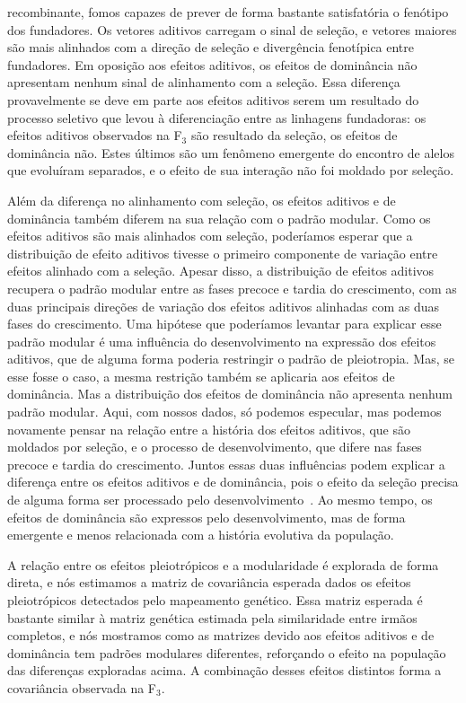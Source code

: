\begin{refsection}
recombinante, fomos capazes de prever de forma bastante satisfatória o
fenótipo dos fundadores. Os vetores aditivos carregam o sinal de seleção, e
vetores maiores são mais alinhados com a direção de seleção e divergência
fenotípica entre fundadores.  Em oposição aos efeitos aditivos, os efeitos de
dominância não apresentam nenhum sinal de alinhamento com a seleção. Essa
diferença provavelmente se deve em parte aos efeitos aditivos serem um
resultado do processo seletivo que levou à diferenciação entre as linhagens
fundadoras: os efeitos aditivos observados na F$_3$ são resultado da seleção,
os efeitos de dominância não. Estes últimos são um fenômeno emergente do
encontro de alelos que evoluíram separados, e o efeito de sua interação não
foi moldado por seleção.

Além da diferença no alinhamento com seleção, os efeitos aditivos e de
dominância também diferem na sua relação com o padrão modular. Como os efeitos
aditivos são mais alinhados com seleção, poderíamos esperar que a distribuição
de efeito aditivos tivesse o primeiro componente de variação entre efeitos
alinhado com a seleção. Apesar disso, a distribuição de efeitos aditivos
recupera o padrão modular entre as fases precoce e tardia do crescimento, com
as duas principais direções de variação dos efeitos aditivos alinhadas com as
duas fases do crescimento. Uma hipótese que poderíamos levantar para explicar
esse padrão modular é uma influência do desenvolvimento na expressão dos
efeitos aditivos, que de alguma forma poderia restringir o padrão de
pleiotropia. Mas, se esse fosse o caso, a mesma restrição também se aplicaria
aos efeitos de dominância. Mas a distribuição dos efeitos de dominância não
apresenta nenhum padrão modular. Aqui, com nossos dados, só podemos especular,
mas podemos novamente pensar na relação entre a história dos efeitos aditivos,
que são moldados por seleção, e o processo de desenvolvimento, que difere nas
fases precoce e tardia do crescimento. Juntos essas duas influências podem
explicar a diferença entre os efeitos aditivos e de dominância, pois o efeito
da seleção precisa de alguma forma ser processado pelo
desenvolvimento~\parencite{Klingenberg2008-ll}. Ao mesmo tempo, os efeitos de
dominância são expressos pelo desenvolvimento, mas de forma emergente e menos
relacionada com a história evolutiva da população.

A relação entre os efeitos pleiotrópicos e a modularidade é explorada de forma
direta, e nós estimamos a matriz de covariância esperada dados
os efeitos pleiotrópicos detectados pelo mapeamento genético. Essa
matriz esperada é bastante similar à matriz genética estimada pela
similaridade entre irmãos completos, e nós mostramos como as matrizes devido
aos efeitos aditivos e de dominância tem padrões modulares diferentes,
reforçando o efeito na população das diferenças exploradas acima. A combinação
desses efeitos distintos forma a covariância observada na F$_3$.


\end{refsection}
